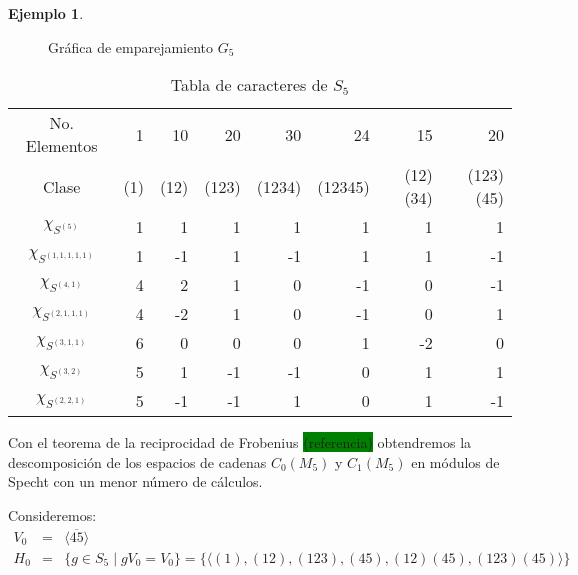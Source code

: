 \documentclass[12pt]{book}
\theoremstyle{definition}
\newtheorem{example}[theorem]{Ejemplo}
\newcounter{in}
\begin{document}
\begin{example}
\begin{figure}[!hbtp]
  \caption{Gráfica de emparejamiento $G_{5}$}
  \label{fig:G_5}
\end{figure}
\begin{table}[!hbtp]
  \centering
  \begin{small}
    \begin{tabular}{c |r r r r r r r}
      No. Elementos& 1 & 10 & 20 & 30 & 24 & 15 & 20  \\
      Clase & (1) & (12) & (123) & (1234) & (12345) & (12)(34) & (123)(45) \\
      \hline
      $\chi_{S^{(5)}}$       & 1 & 1 & 1 & 1 & 1 & 1 & 1 \\
      $\chi_{S^{(1,1,1,1,1)}}$ & 1 & -1 & 1 & -1 & 1 & 1 & -1\\
      $\chi_{S^{(4,1)}}$      & 4 & 2 & 1 & 0 & -1 & 0 & -1\\
      $\chi_{S^{(2,1,1,1)}}$   & 4 & -2 & 1 & 0 & -1 & 0 & 1 \\
      $\chi_{S^{(3,1,1)}}$    & 6 & 0 & 0 & 0 & 1 & -2 & 0 \\
      $\chi_{S^{(3,2)}}$     & 5 & 1 & -1 & -1 & 0 & 1 & 1 \\
      $\chi_{S^{(2,2,1)}}$   & 5 & -1 & -1 & 1 & 0 & 1 & -1 
    \end{tabular}
  \end{small}

  \caption{Tabla de caracteres de $S_{5}$}
  \label{tab:S_5}
\end{table}

Con el teorema de la reciprocidad de Frobenius
\setlength{\fboxsep}{0pt}\colorbox{green}{(referencia)} obtendremos la
descomposición de los espacios de cadenas $C_{0}(M_{5})$ y
$C_{1}(M_{5})$ en módulos de Specht con un menor
número de cálculos. 

Consideremos:
\begin{eqnarray*}
  V_{0}&=&\langle\overline{45}\rangle\\
  H_{0}&=&\{g\in S_{5}\mid gV_{0}=V_{0}\}=\{\langle(1),(12),(123),(45),(12)(45),(123)(45)\rangle\}\\
\end{eqnarray*}


\end{example}
\end{document}
